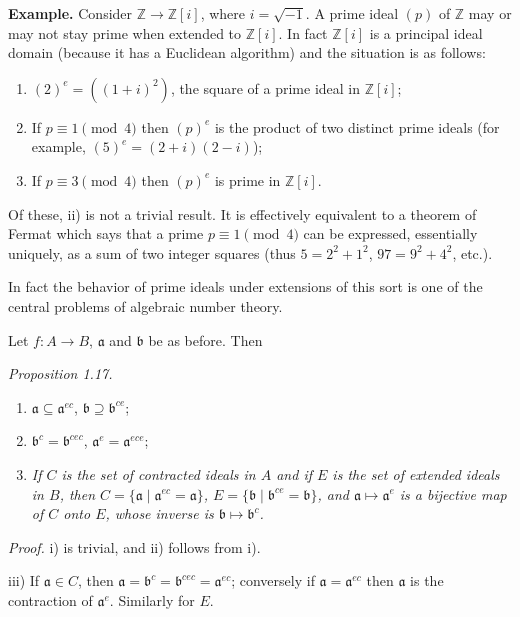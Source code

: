 \noindent\textbf{Example.} Consider $\mathbb Z\longrightarrow\mathbb Z[i]$, where $i=\sqrt{-1}$. A prime ideal $(p)$ of $\mathbb Z$ may or may not stay prime when extended to $\mathbb Z[i]$. In fact $\mathbb Z[i]$ is a principal ideal domain (because it has a Euclidean algorithm) and the situation is as follows:
\begin{enumerate}
\renewcommand{\labelenumi}{\roman{enumi})}
\item $(2)^e=((1+i)^2)$, the square of a prime ideal in $\mathbb Z[i]$;
\item If $p\equiv1\pmod 4$ then $(p)^e$ is the product of two distinct prime ideals (for example, $(5)^e=(2+i)(2-i)$);
\item If $p\equiv3\pmod 4$ then $(p)^e$ is prime in $\mathbb Z[i]$.
\end{enumerate}
Of these, ii) is not a trivial result. It is effectively equivalent to a theorem of Fermat which says that a prime $p\equiv1\pmod 4$ can be expressed, essentially uniquely, as a sum of two integer squares (thus $5=2^2+1^2$, $97=9^2+4^2$, etc.).

In fact the behavior of prime ideals under extensions of this sort is one of the central problems of algebraic number theory.

Let $f:A\longrightarrow B$, $\mathfrak a$ and $\mathfrak b$ be as before. Then

\noindent\textit{Proposition 1.17.}
\begin{enumerate}
\renewcommand{\labelenumi}{\roman{enumi})}
\item $\mathfrak a\subseteq\mathfrak a^{ec}$, $\mathfrak b\supseteq\mathfrak b^{ce}$;
\item $\mathfrak b^c=\mathfrak b^{cec}$, $\mathfrak a^e=\mathfrak a^{ece}$;
\item \textit{If $C$ is the set of contracted ideals in $A$ and if $E$ is the set of extended ideals in $B$, then $C=\{\mathfrak a\mid\mathfrak a^{ec}=\mathfrak a\}$, $E=\{\mathfrak b\mid\mathfrak b^{ce}=\mathfrak b\}$, and $\mathfrak a\mapsto\mathfrak a^e$ is a bijective map of $C$ onto $E$, whose inverse is $\mathfrak b\mapsto\mathfrak b^c$.}
\end{enumerate}

\noindent\textit{Proof.} i) is trivial, and ii) follows from i).

iii) If $\mathfrak a\in C$, then $\mathfrak a=\mathfrak b^c=\mathfrak b^{cec}=\mathfrak a^{ec}$; conversely if $\mathfrak a=\mathfrak a^{ec}$ then $\mathfrak a$ is the contraction of $\mathfrak a^e$. Similarly for $E$. \proofbox

